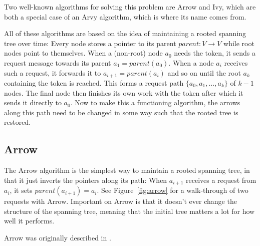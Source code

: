 \documentclass[a4paper, oneside]{discothesis}
\begin{document}
Two well-known algorithms for solving this problem are Arrow and Ivy, which are both a special case of an Arvy algorithm, which is where its name comes from.

All of these algorithms are based on the idea of maintaining a rooted spanning tree over time: Every node stores a pointer to its parent $parent : V \rightarrow V$ while root nodes point to themselves. When a (non-root) node $a_0$ needs the token, it sends a request message towards its parent $a_1=parent(a_0)$. When a node $a_i$ receives such a request, it forwards it to $a_{i+1}=parent(a_i)$ and so on until the root $a_k$ containing the token is reached. This forms a request path $\{a_0,a_1,\dots,a_k\}$ of $k-1$ nodes. The final node then finishes its own work with the token after which it sends it directly to $a_0$. Now to make this a functioning algorithm, the arrows along this path need to be changed in some way such that the rooted tree is restored.

\subsection{Arrow}

The Arrow algorithm is the simplest way to maintain a rooted spanning tree, in that it just inverts the pointers along its path: When $a_{i+1}$ receives a request from $a_i$, it sets $parent(a_{i+1})=a_i$. See Figure~\ref{fig:arrow} for a walk-through of two requests with Arrow. Important on Arrow is that it doesn't ever change the structure of the spanning tree, meaning that the initial tree matters a lot for how well it performs.

Arrow was originally described in \cite{Ray}.

\end{document}
